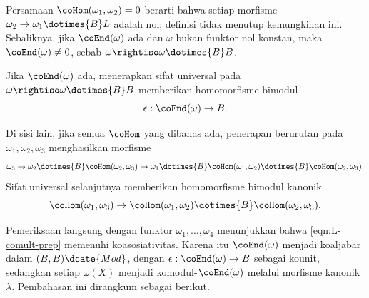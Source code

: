 \begin{remark}
	Persamaan $\coHom(\omega_1,\omega_2)=0$ berarti bahwa setiap morfisme
	$\omega_2\to\omega_1\dotimes{B}L$ adalah nol; definisi tidak menutup
	kemungkinan ini. Sebaliknya, jika $\coEnd(\omega)$ ada dan $\omega$
	bukan funktor nol konstan, maka $\coEnd(\omega)\neq0$, sebab
	$\omega\rightiso\omega\dotimes{B}B$.
\end{remark}

Jika $\coEnd(\omega)$ ada, menerapkan sifat universal pada
$\omega\rightiso\omega\dotimes{B}B$ memberikan homomorfisme bimodul
\[ \epsilon: \coEnd(\omega) \to B. \]

Di sisi lain, jika semua $\coHom$ yang dibahas ada, penerapan berurutan
pada $\omega_1,\omega_2,\omega_3$ menghasilkan morfisme
\begin{equation*}
	\omega_3 \to \omega_2 \dotimes{B} \coHom(\omega_2, \omega_3) \to \omega_1 \dotimes{B} \coHom(\omega_1, \omega_2) \dotimes{B} \coHom(\omega_2, \omega_3).
\end{equation*}
Sifat universal selanjutnya memberikan homomorfisme bimodul kanonik
\begin{equation}\label{eqn:L-comult-prep}
	\coHom(\omega_1, \omega_3) \to \coHom(\omega_1, \omega_2) \dotimes{B} \coHom(\omega_2, \omega_3).
\end{equation}

Pemeriksaan langsung dengan funktor $\omega_1,\ldots,\omega_4$ menunjukkan bahwa
\eqref{eqn:L-comult-prep} memenuhi koasosiativitas. Karena itu
$\coEnd(\omega)$ menjadi koaljabar dalam $(B,B)\dcate{Mod}$, dengan
$\epsilon:\coEnd(\omega)\to B$ sebagai kounit, sedangkan setiap
$\omega(X)$ menjadi komodul-$\coEnd(\omega)$ melalui morfisme kanonik
$\lambda$. Pembahasan ini dirangkum sebagai berikut.

